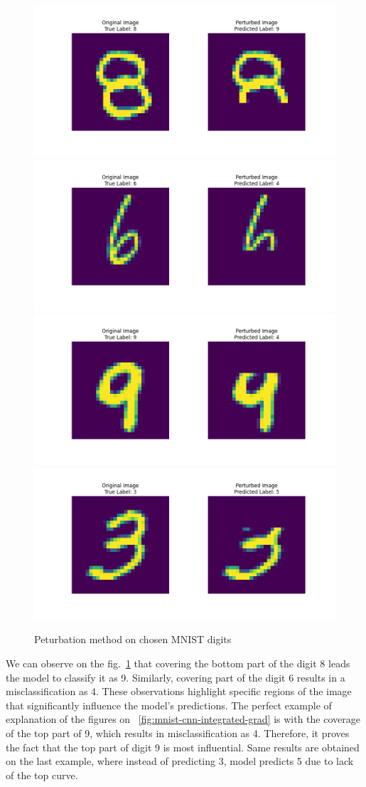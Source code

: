 \documentclass[journal, a4paper]{IEEEtran}
\begin{document}
\begin{figure}[ht]\centering
    \includegraphics[width=.6\linewidth]{img/counterfacts/MNIST/cover_bottom/img_1}
    \includegraphics[width=.6\linewidth]{img/counterfacts/MNIST/cover_bottom/img_3}
    \includegraphics[width=.6\linewidth]{img/counterfacts/MNIST/cover_top/img_10}
    \includegraphics[width=.6\linewidth]{img/counterfacts/MNIST/cover_top/img_3}
    \caption{Peturbation method on chosen MNIST digits}\label{fig:mnist-cnn-counterfacts}
\end{figure}

We can observe on the fig.~\ref{fig:mnist-cnn-counterfacts} that covering the bottom part of the digit 8 leads the model to classify it as 9.
Similarly, covering part of the digit 6 results in a misclassification as 4.
These observations highlight specific regions of the image that significantly influence the model's predictions.
The perfect example of explanation of the figures on ~\ref{fig:mnist-cnn-integrated-grad} is with the coverage of the top part of 9, which results in misclassification as 4.
Therefore, it proves the fact that the top part of digit 9 is most influential.
Same results are obtained on the last example, where instead of predicting 3, model predicts 5 due to lack of the top curve.
\end{document}
